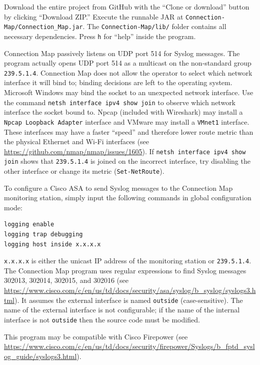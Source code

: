 \documentclass[12pt]{article}
\begin{document}
Download the entire project from GitHub with the ``Clone or download'' button by clicking ``Download ZIP.'' Execute the runnable JAR at \texttt{Connection-Map/Connection\_Map.jar}. The \texttt{Connection-Map/lib/} folder contains all necessary dependencies. Press \texttt{h} for ``help'' inside the program.

Connection Map passively listens on UDP port 514 for Syslog messages. The program actually opens UDP port 514 as a multicast on the non-standard group \texttt{239.5.1.4}. Connection Map does not allow the operator to select which network interface it will bind to; binding decisions are left to the operating system. Microsoft Windows may bind the socket to an unexpected network interface. Use the command \texttt{netsh interface ipv4 show join} to observe which network interface the socket bound to. Npcap (included with Wireshark) may install a \texttt{Npcap Loopback Adapter} interface and VMware may install a \texttt{VMnet1} interface. These interfaces may have a faster ``speed'' and therefore lower route metric than the physical Ethernet and Wi-Fi interfaces (see \url{https://github.com/nmap/nmap/issues/1605}). If \texttt{netsh interface ipv4 show join} shows that \texttt{239.5.1.4} is joined on the incorrect interface, try disabling the other interface or change its metric (\texttt{Set-NetRoute}).

To configure a Cisco ASA to send Syslog messages to the Connection Map monitoring station, simply input the following commands in global configuration mode:

\begin{lstlisting}
logging enable
logging trap debugging
logging host inside x.x.x.x
\end{lstlisting}

\texttt{x.x.x.x} is either the unicast IP address of the monitoring station or \texttt{239.5.1.4}. The Connection Map program uses regular expressions to find Syslog messages 302013, 302014, 302015, and 302016 (see \url{https://www.cisco.com/c/en/us/td/docs/security/asa/syslog/b_syslog/syslogs3.html}). It assumes the external interface is named \texttt{outside} (case-sensitive). The name of the external interface is not configurable; if the name of the internal interface is not \texttt{outside} then the source code must be modified.

This program may be compatible with Cisco Firepower (see \url{https://www.cisco.com/c/en/us/td/docs/security/firepower/Syslogs/b_fptd_syslog_guide/syslogs3.html}).
\end{document}
